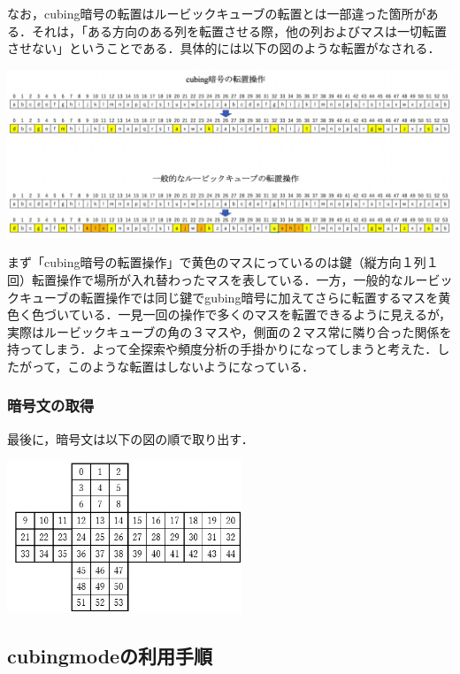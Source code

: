 \documentclass{jsarticle}
\begin{document}
なお，cubing暗号の転置はルービックキューブの転置とは一部違った箇所がある．それは，「ある方向のある列を転置させる際，他の列およびマスは一切転置させない」ということである．具体的には以下の図のような転置がなされる．\\
\begin{center}
  \includegraphics[width=18cm]{./tex_pic/trans.png}\\
\end{center}
まず「cubing暗号の転置操作」で黄色のマスにっているのは鍵（縦方向１列１回）転置操作で場所が入れ替わったマスを表している．一方，一般的なルービックキューブの転置操作では同じ鍵でgubing暗号に加えてさらに転置するマスを黄色く色づいている．一見一回の操作で多くのマスを転置できるように見えるが，実際はルービックキューブの角の３マスや，側面の２マス常に隣り合った関係を持ってしまう．よって全探索や頻度分析の手掛かりになってしまうと考えた．したがって，このような転置はしないようになっている．

\subsubsection{暗号文の取得}
最後に，暗号文は以下の図の順で取り出す．
\begin{center}
  \includegraphics[width=7cm]{./tex_pic/seq.jpg}\\
\end{center}
\subsection{cubingmodeの利用手順}
\end{document}
